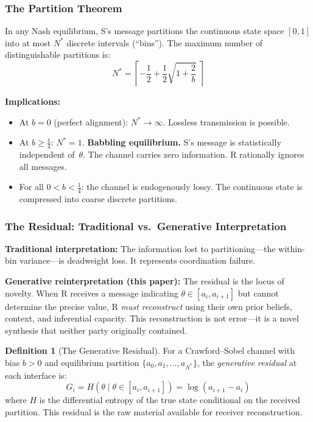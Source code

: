 \documentclass[12pt,letterpaper]{article}
\theoremstyle{definition}
\newtheorem{definition}[theorem]{Definition}
\theoremstyle{remark}
\begin{document}
\subsubsection{The Partition Theorem}

In any Nash equilibrium, S's message partitions the continuous state space $[0,1]$ into at most $N^*$ discrete intervals (``bins''). The maximum number of distinguishable partitions is:
\begin{equation}
N^* = \left\lceil -\frac{1}{2} + \frac{1}{2}\sqrt{1 + \frac{2}{b}} \;\right\rceil
\end{equation}

\textbf{Implications:}
\begin{itemize}
    \item At $b = 0$ (perfect alignment): $N^* \to \infty$. Lossless transmission is possible.
    \item At $b \geq \tfrac{1}{4}$: $N^* = 1$. \textbf{Babbling equilibrium.} S's message is statistically independent of~$\theta$. The channel carries zero information. R rationally ignores all messages.
    \item For all $0 < b < \tfrac{1}{4}$: the channel is endogenously lossy. The continuous state is compressed into coarse discrete partitions.
\end{itemize}

\subsubsection{The Residual: Traditional vs.\ Generative Interpretation}

\textbf{Traditional interpretation:} The information lost to partitioning---the within-bin variance---is deadweight loss. It represents coordination failure.

\textbf{Generative reinterpretation (this paper):} The residual is the locus of novelty. When R receives a message indicating $\theta \in [a_i, a_{i+1}]$ but cannot determine the precise value, R \emph{must reconstruct} using their own prior beliefs, context, and inferential capacity. This reconstruction is not error---it is a novel synthesis that neither party originally contained.

\begin{definition}[The Generative Residual]
\label{def:residual}
For a Crawford--Sobel channel with bias $b > 0$ and equilibrium partition $\{a_0, a_1, \ldots, a_{N^*}\}$, the \emph{generative residual} at each interface is:
\begin{equation}
G_i = H(\theta \mid \theta \in [a_i, a_{i+1}]) = \log(a_{i+1} - a_i)
\end{equation}
where $H$ is the differential entropy of the true state conditional on the received partition. This residual is the raw material available for receiver reconstruction.
\end{definition}
\end{document}
